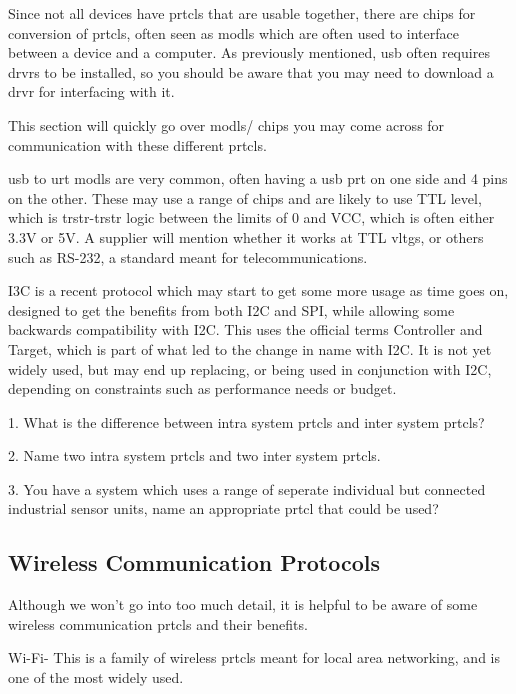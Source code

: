 \documentclass[a4paper,11pt]{report}
\newcommand{\Quiz}[1] %
{
\par\noindent %
\phantomsection %
\todo[inline, color=blue!30]{\textbf{#1}} %
\vspace{1em} %
}
\begin{document}
Since not all devices have \gls{prtcl}s that are usable together, there are chips for conversion of \gls{prtcl}s, often seen as \gls{modl}s which are often used to interface between a device and a computer. As previously mentioned, \gls{usb} often requires \gls{drvr}s to be installed, so you should be aware that you may need to download a \gls{drvr} for interfacing with it.

This section will quickly go over \gls{modl}s/ chips you may come across for communication with these different \gls{prtcl}s.

\gls{usb} to \gls{urt} \gls{modl}s are very common, often having a \gls{usb} \gls{prt} on one side and 4 pins on the other. These may use a range of chips and are likely to use TTL level, which is \gls{trstr}-\gls{trstr} logic between the limits of 0 and VCC, which is often either 3.3V or 5V. A supplier will mention whether it works at TTL \gls{vltg}s, or others such as RS-232, a standard meant for telecommunications.

I3C is a recent protocol which may start to get some more usage as time goes on, designed to get the benefits from both I2C and SPI, while allowing some backwards compatibility with I2C. This uses the official terms Controller and Target, which is part of what led to the change in name with I2C. It is not yet widely used, but may end up replacing, or being used in conjunction with I2C, depending on constraints such as performance needs or budget.

\Quiz{Quiz}

1. What is the difference between intra system \gls{prtcl}s and inter system \gls{prtcl}s?

2. Name two intra system \gls{prtcl}s and two inter system \gls{prtcl}s.

3. You have a system which uses a range of seperate individual but connected industrial sensor units, name an appropriate \gls{prtcl} that could be used?

\vspace*{1\baselineskip}

\subsection{Wireless Communication Protocols}

Although we won't go into too much detail, it is helpful to be aware of some wireless communication \gls{prtcl}s and their benefits.

Wi-Fi- This is a family of wireless \gls{prtcl}s meant for local area networking, and is one of the most widely used.
\end{document}
